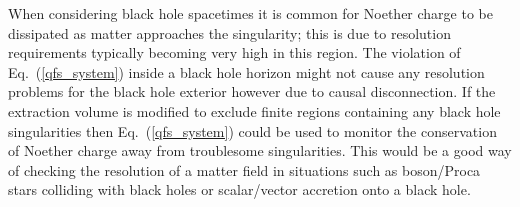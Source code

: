 When considering black hole spacetimes it is common for Noether charge to be dissipated as matter approaches the singularity; this is due to resolution requirements typically becoming very high in this region. The violation of Eq.~(\ref{qfs_system}) inside a black hole horizon might not cause any resolution problems for the black hole exterior however due to causal disconnection. If the extraction volume is modified to exclude finite regions containing any black hole singularities then Eq.~(\ref{qfs_system}) could be used to monitor the conservation of Noether charge away from troublesome singularities. This would be a good way of checking the resolution of a matter field in situations such as boson/Proca stars colliding with black holes or scalar/vector accretion onto a black hole.






